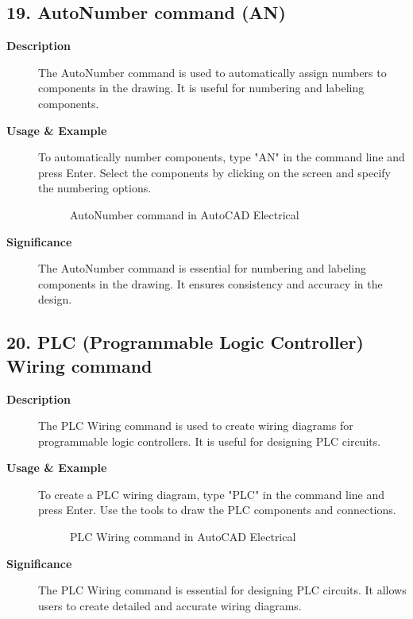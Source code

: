\documentclass[12pt]{article}
\begin{document}
\subsection*{19. AutoNumber command (AN)}
\begin{description}
    \item [\textbf{Description}] The AutoNumber command is used to automatically assign numbers to components in the drawing. It is useful for numbering and labeling components.
    \item [\textbf{Usage \& Example}] To automatically number components, type "AN" in the command line and press Enter. Select the components by clicking on the screen and specify the numbering options.
          \begin{figure}[H]
              \centering
              \caption{AutoNumber command in AutoCAD Electrical}
          \end{figure}
    \item [\textbf{Significance}] The AutoNumber command is essential for numbering and labeling components in the drawing. It ensures consistency and accuracy in the design.
\end{description}

\subsection*{20. PLC (Programmable Logic Controller) Wiring command}
\begin{description}
    \item [\textbf{Description}] The PLC Wiring command is used to create wiring diagrams for programmable logic controllers. It is useful for designing PLC circuits.
    \item [\textbf{Usage \& Example}] To create a PLC wiring diagram, type "PLC" in the command line and press Enter. Use the tools to draw the PLC components and connections.
          \begin{figure}[H]
              \centering
              \caption{PLC Wiring command in AutoCAD Electrical}
          \end{figure}
    \item [\textbf{Significance}] The PLC Wiring command is essential for designing PLC circuits. It allows users to create detailed and accurate wiring diagrams.
\end{description}
\end{document}

